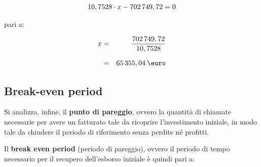 	\begin{equation}
	\label{eq:van_pareggio_1}
	\begin{split}
 		10,7528 \cdot x - 702\thinspace 749,72 = 0	
 	\end{split}
	\end{equation}			

pari a:
			
	\begin{eqnarray}
	\label{eq:van_pareggio_2}
		x & = & \frac{702\thinspace 749,72	}{10,7528}	 	\nonumber \\[1.5ex] 
		  & = &  65\thinspace 355,04 \: \mbox{\euro} 
	\end{eqnarray}






\subsection[Break-even period]{Break-even period}
	Si analizza, infine, il \textbf{punto di pareggio}, ovvero la quantità di chiamate necessarie per avere un fatturato tale da ricoprire l'investimento iniziale, in modo tale da chiudere il periodo di riferimento senza perdite né profitti.

Il \textbf{break even period} (periodo di pareggio), ovvero il periodo di tempo necessario per il recupero dell'esborso iniziale è quindi pari a:   	

